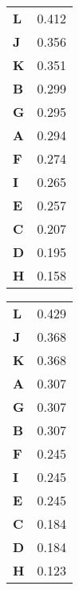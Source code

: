 \begin{table}[!h]
\centering
\centering
\begin{tabular}[t]{>{}lr}
\toprule
\textbf{L} & 0.412\\
\textbf{J} & 0.356\\
\textbf{K} & 0.351\\
\textbf{B} & 0.299\\
\textbf{G} & 0.295\\
\textbf{A} & 0.294\\
\textbf{F} & 0.274\\
\textbf{I} & 0.265\\
\textbf{E} & 0.257\\
\textbf{C} & 0.207\\
\textbf{D} & 0.195\\
\textbf{H} & 0.158\\
\bottomrule
\end{tabular}
\centering
\begin{tabular}[t]{lr}
\toprule
\textbf{L} & 0.429\\
\textbf{J} & 0.368\\
\textbf{K} & 0.368\\
\textbf{A} & 0.307\\
\textbf{G} & 0.307\\
\textbf{B} & 0.307\\
\textbf{F} & 0.245\\
\textbf{I} & 0.245\\
\textbf{E} & 0.245\\
\textbf{C} & 0.184\\
\textbf{D} & 0.184\\
\textbf{H} & 0.123\\
\bottomrule
\end{tabular}
\end{table}
